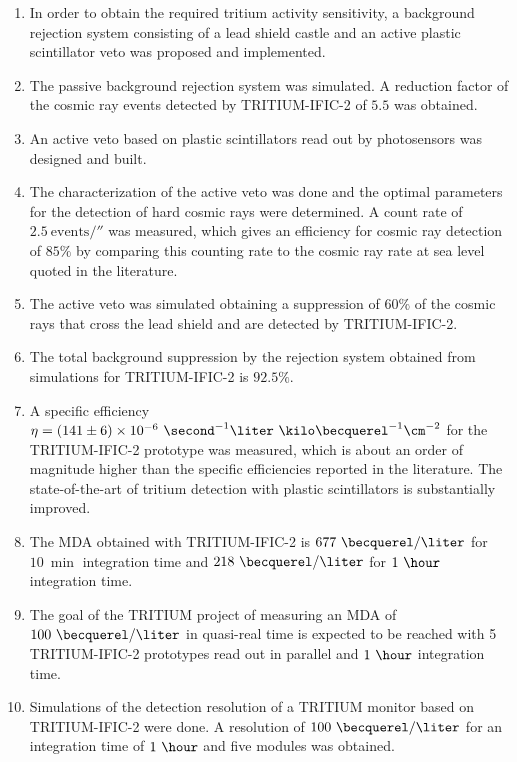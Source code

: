 \begin{enumerate}
\item{} In order to obtain the required tritium activity sensitivity, a background rejection system consisting of a lead shield castle and an active plastic scintillator veto was proposed and implemented.

\item{} The passive background rejection system was simulated. A reduction factor of the cosmic ray events detected by TRITIUM-IFIC-2 of $5.5$ was obtained.

\item{} An active veto based on plastic scintillators read out by photosensors was designed and built.

\item{} The characterization of the active veto was done and the optimal parameters for the detection of hard cosmic rays were determined. A count rate of $2.5~\text{events}/\second$ was measured, which gives an efficiency for cosmic ray detection of $85\%$ by comparing this counting rate to the cosmic ray rate at sea level quoted in the literature.

\item{} The active veto was simulated obtaining a suppression of $60\%$ of the cosmic rays that cross the lead shield and are detected by TRITIUM-IFIC-2.

\item{} The total background suppression by the rejection system obtained from simulations for TRITIUM-IFIC-2 is $92.5\%$.

\item{} A specific efficiency $\eta = (141 \pm 6) \times 10^{-6}~ \second^{-1}  \liter ~ \kilo\becquerel^{-1} \cm^{-2}$ for the TRITIUM-IFIC-2  prototype was measured, which is about an order of magnitude higher than the specific efficiencies reported in the literature. The state-of-the-art of tritium detection with plastic scintillators is substantially improved.

\item{} The MDA obtained with TRITIUM-IFIC-2 is $677~\becquerel/\liter$  for $10~\min$ integration time and $218~\becquerel/\liter$ for $1~\hour$ integration time.

\item{} The goal of the TRITIUM project of measuring an MDA of $100~\becquerel/\liter$ in quasi-real time is expected to be reached with 5 TRITIUM-IFIC-2 prototypes read out in parallel and $1~\hour$ integration time.

\item{} Simulations of the detection resolution of a TRITIUM monitor based on TRITIUM-IFIC-2 were done. A resolution of $100~\becquerel/\liter$ for an integration time of $1~\hour$ and five modules was obtained.


\end{enumerate}
